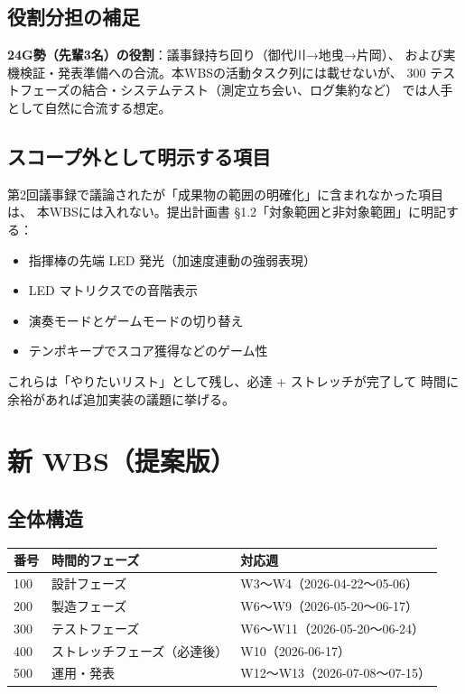 \documentclass[lualatex,book,paper=a4paper,jafontsize=11pt,jafontscale=1.05]{jlreq}
\begin{document}
\section{役割分担の補足}\label{sec:roles}

\textbf{24G勢（先輩3名）の役割}：議事録持ち回り（御代川→地曵→片岡）、
および実機検証・発表準備への合流。本WBSの活動タスク列には載せないが、
300 テストフェーズの結合・システムテスト（測定立ち会い、ログ集約など）
では人手として自然に合流する想定。

\section{スコープ外として明示する項目}

第2回議事録で議論されたが「成果物の範囲の明確化」に含まれなかった項目は、
本WBSには入れない。提出計画書 §1.2「対象範囲と非対象範囲」に明記する：

\begin{itemize}
  \item 指揮棒の先端 LED 発光（加速度連動の強弱表現）
  \item LED マトリクスでの音階表示
  \item 演奏モードとゲームモードの切り替え
  \item テンポキープでスコア獲得などのゲーム性
\end{itemize}

これらは「やりたいリスト」として残し、必達 + ストレッチが完了して
時間に余裕があれば追加実装の議題に挙げる。

\chapter{新 WBS（提案版）}

\section{全体構造}

\begin{center}
\begin{tabular}{lll}
\toprule
\textbf{番号} & \textbf{時間的フェーズ} & \textbf{対応週} \\
\midrule
100 & 設計フェーズ & W3〜W4（2026-04-22〜05-06） \\
200 & 製造フェーズ & W6〜W9（2026-05-20〜06-17） \\
300 & テストフェーズ & W6〜W11（2026-05-20〜06-24） \\
400 & ストレッチフェーズ（必達後） & W10（2026-06-17） \\
500 & 運用・発表 & W12〜W13（2026-07-08〜07-15） \\
\bottomrule
\end{tabular}
\end{center}
\end{document}
